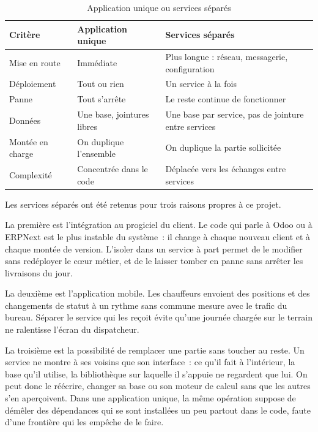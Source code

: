\begin{table}[H]
\centering
\caption{Application unique ou services séparés}
\label{tab:mono-vs-micro}
\small
\begin{tabular}{L{3.2cm}L{5.5cm}L{5.5cm}}
\hline
{}
\textbf{Critère} & \textbf{Application unique} & \textbf{Services séparés} \\
\hline
Mise en route & Immédiate & Plus longue : réseau, messagerie, configuration \\
\hline
Déploiement & Tout ou rien & Un service à la fois \\
\hline
Panne & Tout s'arrête & Le reste continue de fonctionner \\
\hline
Données & Une base, jointures libres & Une base par service, pas de jointure entre services \\
\hline
Montée en charge & On duplique l'ensemble & On duplique la partie sollicitée \\
\hline
Complexité & Concentrée dans le code & Déplacée vers les échanges entre services \\
\hline
\end{tabular}
\end{table}

Les services séparés ont été retenus pour trois raisons propres à ce projet.

La première est l'intégration au progiciel du client. Le code qui parle à Odoo ou à ERPNext est le
plus instable du système~: il change à chaque nouveau client et à chaque montée de version. L'isoler
dans un service à part permet de le modifier sans redéployer le cœur métier, et de le laisser tomber
en panne sans arrêter les livraisons du jour.

La deuxième est l'application mobile. Les chauffeurs envoient des positions et des changements de
statut à un rythme sans commune mesure avec le trafic du bureau. Séparer le service qui les reçoit
évite qu'une journée chargée sur le terrain ne ralentisse l'écran du dispatcheur.

La troisième est la possibilité de remplacer une partie sans toucher au reste. Un service ne montre
à ses voisins que son interface~: ce qu'il fait à l'intérieur, la base qu'il utilise, la
bibliothèque sur laquelle il s'appuie ne regardent que lui. On peut donc le réécrire, changer sa
base ou son moteur de calcul sans que les autres s'en aperçoivent. Dans une application unique, la
même opération suppose de démêler des dépendances qui se sont installées un peu partout dans le
code, faute d'une frontière qui les empêche de le faire.

